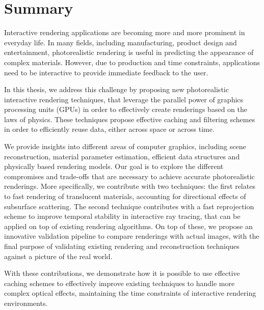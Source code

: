 \chapter{Summary}

Interactive rendering applications are becoming more and more prominent in everyday life. In many fields, including manufacturing, product design and entertainment, photorealistic rendering is useful in predicting the appearance of complex materials. However, due to production and time constraints, applications need to be interactive to provide immediate feedback to the user.

In this thesis, we address this challenge by proposing new photorealistic interactive rendering techniques, that leverage the parallel power of graphics processing units (GPUs) in order to effectively create renderings based on the laws of physics. These techniques propose effective caching and filtering schemes in order to efficiently reuse data, either across space or across time.     
 
We provide insights into different areas of computer graphics, including scene reconstruction, material parameter estimation, efficient data structures and physically based rendering models. Our goal is to explore the different compromises and trade-offs that are necessary to achieve accurate photorealistic renderings. More specifically, we contribute with two techniques: the first relates to fast rendering of translucent materials, accounting for directional effects of subsurface scattering. The second technique contributes with a fast reprojection scheme to improve temporal stability in interactive ray tracing, that can be applied on top of existing rendering algorithms. On top of these, we propose an innovative validation pipeline to compare renderings with actual images, with the final purpose of validating existing rendering and reconstruction techniques against a picture of the real world. 

With these contributions, we demonstrate how it is possible to use effective caching schemes to effectively improve existing techniques to handle more complex optical effects, maintaining the time constraints of interactive rendering environments.